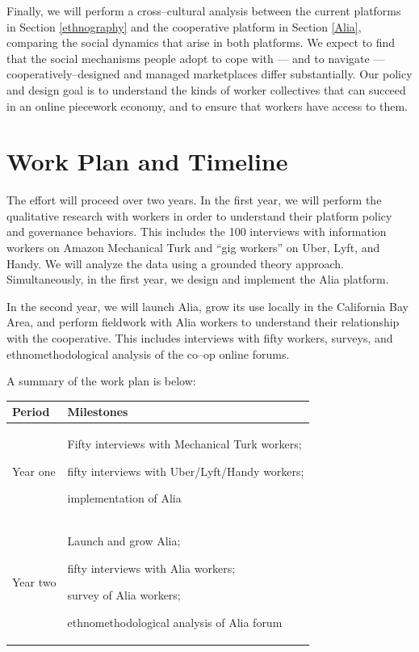 \documentclass[11pt]{article}
\begin{document}
Finally, we will perform
a cross--cultural analysis between the current platforms in
Section \ref{ethnography}
and the cooperative platform in
Section \ref{Alia},
comparing the social dynamics that arise in both platforms.
We expect to find that the social mechanisms people adopt to cope with
--- and to navigate ---
cooperatively--designed and
managed marketplaces differ substantially.
Our policy and design goal is
to understand the kinds of worker collectives that can succeed in an online piecework economy, and
to ensure that workers have access to them.



\section{Work Plan and Timeline}
The effort will proceed over two years.
In the first year,
we will perform the qualitative research with workers in order to understand
their platform policy and governance behaviors.
This includes the 100 interviews with information workers on
  Amazon Mechanical Turk and ``gig workers'' on
  Uber,
  Lyft, and
  Handy.
We will analyze the data using a grounded theory approach.
Simultaneously, in the first year,
we design and implement the Alia platform.

In the second year, we will launch Alia,
grow its use locally in the California Bay Area,
and perform fieldwork with Alia workers to understand their relationship with the cooperative.
This includes interviews with fifty workers,
surveys,
and ethnomethodological analysis of the co--op online forums.

A summary of the work plan is below:

  \begin{tabular}{|p{}|p{}|}
    \hline
\textbf{Period} & \textbf{Milestones} \\
\hline
Year one &
\begin{inlinelist}
  \item Fifty interviews with Mechanical Turk workers;
  \item fifty interviews with Uber/Lyft/Handy workers;
  \item implementation of Alia
\end{inlinelist}
\\
\hline
Year two &
\begin{inlinelist}
  \item Launch and grow Alia;
  \item fifty interviews with Alia workers;
  \item survey of Alia workers;
  \item ethnomethodological analysis of Alia forum
\end{inlinelist}
\\
\hline
  \end{tabular}
\end{document}
